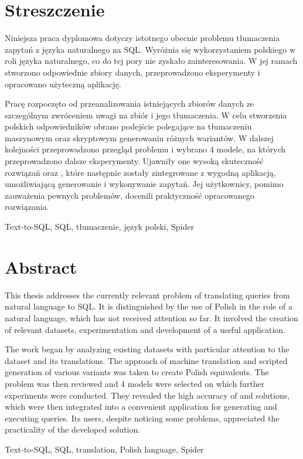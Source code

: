\section*{Streszczenie}
\vspace{1cm}

Niniejsza praca dyplomowa dotyczy istotnego obecnie problemu tłumaczenia zapytań z języka naturalnego na SQL. Wyróżnia się wykorzystaniem polskiego w roli języka naturalnego, co do tej pory nie zyskało zainteresowania. W jej ramach stworzono odpowiednie zbiory danych, przeprowadzono eksperymenty i opracowano użyteczną aplikację.

Pracę rozpoczęto od przeanalizowania istniejących zbiorów danych ze szczególnym zwróceniem uwagi na zbiór  i jego tłumaczenia. W celu stworzenia polskich odpowiedników obrano podejście polegające na tłumaczeniu maszynowym oraz skryptowym generowaniu różnych wariantów. W dalszej kolejności przeprowadzono przegląd problemu  i wybrano 4 modele, na których przeprowadzono dalsze eksperymenty. Ujawniły one wysoką skuteczność rozwiązań  oraz , które następnie zostały zintegrowane z wygodną aplikacją, umożliwiającą generowanie i wykonywanie zapytań. Jej użytkownicy, pomimo zauważenia pewnych problemów, docenili praktyczność opracowanego rozwiązania.

\vspace{1cm}
Text-to-SQL, SQL, tłumaczenie, język polski, Spider
\clearpage

\section*{Abstract}
\vspace{1cm}

This thesis addresses the currently relevant problem of translating queries from natural language to SQL. It is distinguished by the use of Polish in the role of a natural language, which has not received attention so far. It involved the creation of relevant datasets, experimentation and development of a useful application.

The work began by analyzing existing datasets with particular attention to the  dataset and its translations. The approach of machine translation and scripted generation of various variants was taken to create Polish equivalents. The  problem was then reviewed and 4 models were selected on which further experiments were conducted. They revealed the high accuracy of  and  solutions, which were then integrated into a convenient application for generating and executing queries. Its users, despite noticing some problems, appreciated the practicality of the developed solution.

\vspace{1cm}
Text-to-SQL, SQL, translation, Polish language, Spider
\clearpage
